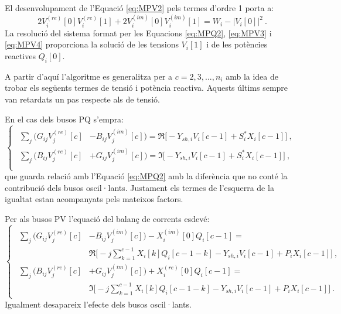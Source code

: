 El desenvolupament de l'Equació \ref{eq:MPV2} pels termes d'ordre 1 porta a:
\begin{equation}
    2V^{(re)}_i[0]V^{(re)}_i[1]+2V^{(im)}_i[0]V^{(im)}_i[1]=W_i-|V_i[0]|^2\ .
        \label{eq:MPV4}
\end{equation}
La resolució del sistema format per les Equacions \ref{eq:MPQ2}, \ref{eq:MPV3} i \ref{eq:MPV4} proporciona la solució de les tensions $V_i[1]$ i de les potències reactives $Q_i[0]$. 

A partir d'aquí l'algoritme es generalitza per a $c=2, 3, ..., n_i$ amb la idea de trobar els següents termes de tensió i potència reactiva. Aquests últims sempre van retardats un pas respecte als de tensió.

En el cas dels busos PQ s'empra:
\begin{equation}
    \begin{cases}
    \begin{split}
        \sum_j(G_{ij}V^{(re)}_j[c]&-B_{ij}V^{(im)}_j[c]) = \Re\biggl[-Y_{sh,i}V_i[c-1]+S^*_iX_i[c-1]\biggr]\ ,\\
        \sum_j(B_{ij}V^{(re)}_j[c]&+G_{ij}V^{(im)}_j[c]) = \Im\biggl[-Y_{sh,i}V_i[c-1]+S^*_iX_i[c-1]\biggr]\ ,\\
    \end{split}
\end{cases}
    \label{eq:MPQ3}
\end{equation}
que guarda relació amb l'Equació \ref{eq:MPQ2} amb la diferència que no conté la contribució dels busos oscil·lants. Justament els termes de l'esquerra de la igualtat estan acompanyats pels mateixos factors. 

Per als busos PV l'equació del balanç de corrents esdevé:
\begin{equation}
    \begin{cases}
    \begin{split}
        \sum_j(G_{ij}V^{(re)}_j[c]&-B_{ij}V^{(im)}_j[c])-X^{(im)}_i[0]Q_i[c-1] = \\
        &\Re\biggl[-j\sum_{k=1}^{c-1}X_i[k]Q_i[c-1-k]-Y_{sh,i}V_i[c-1]+P_iX_i[c-1]\biggr]\ ,\\
        \sum_j(B_{ij}V^{(re)}_j[c]&+G_{ij}V^{(im)}_j[c])+X^{(re)}_i[0]Q_i[c-1] = \\
        &\Im\biggl[-j\sum_{k=1}^{c-1}X_i[k]Q_i[c-1-k]-Y_{sh,i}V_i[c-1]+P_iX_i[c-1]\biggr]\ .
    \end{split}
\end{cases}
    \label{eq:MPV5}
\end{equation}
Igualment desapareix l'efecte dels busos oscil·lants. 

